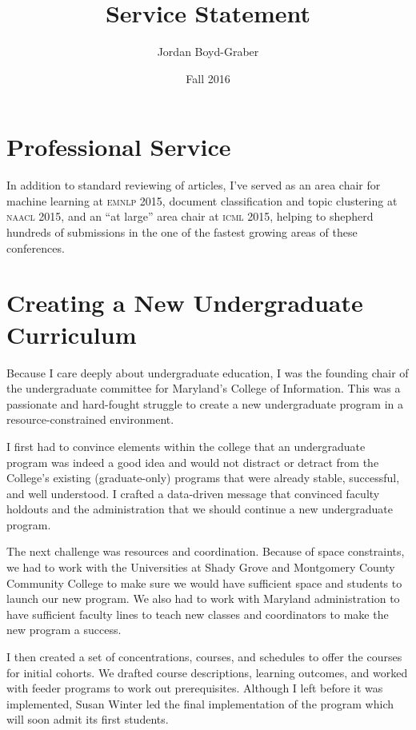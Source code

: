 \documentclass[11pt]{amsart}
\newcommand{\abr}[1]{\textsc{#1}}
\begin{document}
 \title{Service Statement}

 \author{Jordan Boyd-Graber}
\address{University of Colorado}

\date{Fall 2016}


\keywords{}

\maketitle

\section{Professional Service}

In addition to standard reviewing of articles, I've served as an area chair for
machine learning at \abr{emnlp} 2015, document classification and topic
clustering at \abr{naacl} 2015, and an ``at large'' area chair at \abr{icml}
2015, helping to shepherd hundreds of submissions in the one of the fastest
growing areas of these conferences.

\section{Creating a New Undergraduate Curriculum}

Because I care deeply about undergraduate education, I was the founding chair of
the undergraduate committee for Maryland's College of Information.  This was a
passionate and hard-fought struggle to create a new undergraduate program in a
resource-constrained environment.

I first had to convince elements within the college that an undergraduate
program was indeed a good idea and would not distract or detract from the
College's existing (graduate-only) programs that were already stable,
successful, and well understood.  I crafted a data-driven message that convinced
faculty holdouts and the administration that we should continue a new
undergraduate program.

The next challenge was resources and coordination.  Because of space constraints,
we had to work with the Universities at Shady Grove and Montgomery County
Community College to make sure we would have sufficient space and students to
launch our new program.  We also had to work with Maryland administration to
have sufficient faculty lines to teach new classes and coordinators to make the
new program a success.

I then created a set of concentrations, courses, and schedules to offer the
courses for initial cohorts.  We drafted course descriptions, learning outcomes,
and worked with feeder programs to work out prerequisites.  Although I left
before it was implemented, Susan Winter led the final implementation of the
program which will soon admit its first students.
\end{document}
